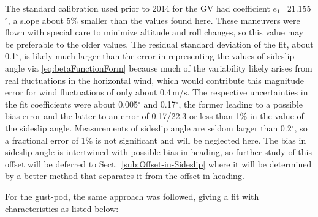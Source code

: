 \documentclass[12pt,twoside,english]{article}\usepackage[]{graphicx}\usepackage[]{color}
\let\OrgIndex\index
\renewcommand*{\index}[1]{\OrgIndex{#1}}
\begin{document}
The standard calibration used prior to 2014 for the GV had coefficient $e_{1}$=21.155$^{\circ}$, a slope about 5\% smaller than the values found here. These maneuvers were flown with special care to minimize altitude and roll changes, so this value may be preferable to the older values. The residual standard deviation of the fit, about 0.1$^{\circ}$, is likely much larger than the error in representing the values of sideslip angle via \eqref{eq:betaFunctionForm} because much of the variability likely arises from real fluctuations in the horizontal wind, which would contribute this magnitude error for wind fluctuations of only about 0.4\,m/s. The respective uncertainties in the fit coefficients were about 0.005$^{\circ}$ and 0.17$^{\circ}$, the former leading to a possible bias error and the latter to an error of 0.17/22.3 or less than 1\% in the value of the sideslip angle. Measurements of sideslip angle are seldom larger than 0.2$^{\circ}$, so a fractional error of 1\% is not significant and will be neglected here. The bias in sideslip angle is intertwined with possible bias in heading, so further study of this offset will be deferred to Sect.~\ref{sub:Offset-in-Sideslip} where it will be determined by a better method that separates it from the offset in heading. 



For the gust-pod, the same approach was followed, giving a fit with characteristics as listed below: 
\end{document}
